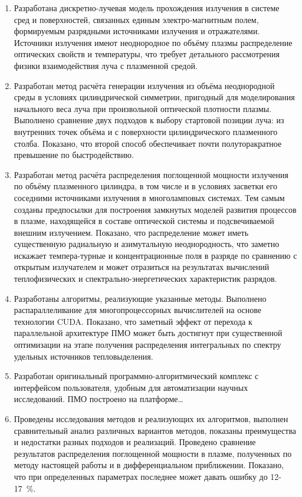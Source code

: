 \begin{enumerate}
	\item Разработана дискретно-лучевая модель прохождения излучения в системе сред и поверхностей, связанных единым электро-магнитным полем, формируемым разрядными источниками излучения и отражателями.
	Источники излучения имеют неоднородное по объёму плазмы распределение оптических свойств и температуры, что требует детального рассмотрения  физики  взаимодействия луча с плазменной средой.

	\item Разработан метод расчёта генерации излучения из объёма неоднородной среды в условиях цилиндрической симметрии, пригодный для моделирования начального веса луча при произвольной оптической плотности плазмы.
	Выполнено сравнение двух подходов к выбору стартовой позиции луча: из внутренних точек объёма и с поверхности цилиндрического плазменного столба.
	Показано, что второй способ обеспечивает почти полуторакратное превышение по быстродействию.

	\item Разработан метод расчёта распределения поглощенной мощности излучения по объёму плазменного цилиндра, в том числе и в условиях засветки его соседними источниками излучения в многоламповых системах.
	Тем самым созданы предпосылки для построения замкнутых  моделей развития процессов в плазме, находящейся  в составе оптической системы и подсвечиваемой внешним излучением. Показано, что распределение может иметь существенную радиальную и азимутальную неоднородность, что заметно искажает темпера-турные и концентрационные поля в разряде по сравнению с открытым излучателем и может отразиться на результатах вычислений теплофизических и спектрально-энергетических характеристик разрядов.

	\item Разработаны алгоритмы, реализующие указанные методы.
	Выполнено распараллеливание для многопроцессорных вычислителей на основе технологии CUDA.
	Показано, что заметный эффект от перехода к параллельной архитектуре ПМО может быть достигнут при существенной оптимизации на этапе получения распределения интегральных по спектру удельных источников тепловыделения.

	\item Разработан оригинальный программно-алгоритмический комплекс с интерфейсом пользователя, удобным для автоматизации научных исследований.
	ПМО построено на платформе…

	\item Проведены исследования методов и реализующих их алгоритмов, выполнен сравнительный анализ различных вариантов методов, показаны преимущества и недостатки разных подходов и реализаций.
	Проведено сравнение результатов распределения поглощенной мощности в плазме, полученных по методу настоящей работы и в дифференциальном приближении.
	Показано, что при определенных параметрах последнее может давать ошибку до 12-17~\%.


\end{enumerate}

